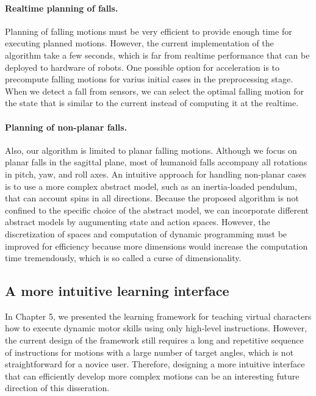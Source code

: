 \paragraph{Realtime planning of falls.}
Planning of falling motions must be very efficient to provide enough time for
executing planned motions. 
However, the current implementation of the algorithm take a few seconds, which
is far from realtime performance that can be deployed to hardware of robots.
One possible option for acceleration is to precompute falling motions for
varius initial cases in the preprocessing stage.
When we detect a fall from sensors, we can select the optimal falling motion
for the state that is similar to the current instead of computing it at the
realtime.

\paragraph{Planning of non-planar falls.}
Also, our algorithm is limited to planar falling motions.
Although we focus on planar falls in the sagittal plane, most of humanoid falls
accompany all rotations in pitch, yaw, and roll axes.
An intuitive approach for handling non-planar cases is to use a more complex
abstract model, such as an inertia-loaded pendulum, that can account spins in
all directions.
Because the proposed algorithm is not confined to the specific choice of the
abstract model, we can incorporate different abstract models by augumenting
state and action spaces. 
However, the discretization of spaces and computation of dynamic programming
must be improved for efficiency because more dimensions would increase the
computation time tremendously, which is so called a curse of dimensionality. 

\subsection{A more intuitive learning interface}

In Chapter 5, we presented the learning framework for teaching
virtual characters how to execute dynamic motor skills using only high-level
instructions. 
However, the current design of the framework still requires a long and
repetitive sequence of instructions for motions with a large number of target
angles, which is not straightforward for a novice user. 
Therefore, designing a more intuitive interface that can efficiently develop
more complex motions can be an interesting future direction of this
disseration. 

